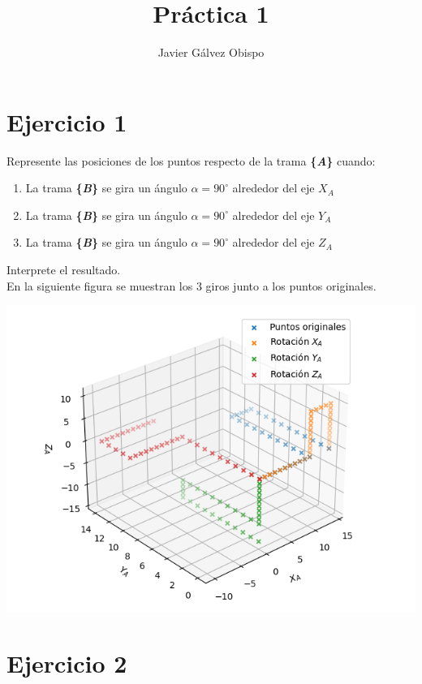 \documentclass[12pt,a4paper]{report}
\title{Práctica 1}
\author{Javier Gálvez Obispo }
\begin{document}
\maketitle

\section*{Ejercicio 1}


\noindent
Represente las posiciones de los puntos respecto de la trama \textbf{\{\textit{A}\}} cuando:
\renewcommand{\theenumi}{\alph{enumi}}
\begin{enumerate}
    \item La trama \textbf{\{\textit{B}\}} se gira un ángulo $\alpha = 90^\circ$ alrededor del eje $X_A$
    \item La trama \textbf{\{\textit{B}\}} se gira un ángulo $\alpha = 90^\circ$ alrededor del eje $Y_A$
    \item La trama \textbf{\{\textit{B}\}} se gira un ángulo $\alpha = 90^\circ$ alrededor del eje $Z_A$
\end{enumerate}
Interprete el resultado.\\

\noindent
En la siguiente figura se muestran los 3 giros junto a los puntos originales.

\includegraphics[]{Ejercicio_1.png}

\section*{Ejercicio 2}
\end{document}
